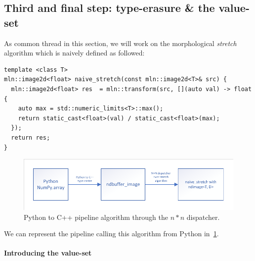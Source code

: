 \subsection{Third and final step: type-erasure \& the value-set}

As common thread in this section, we will work on the morphological \emph{stretch} algorithm which is naively defined as
followed:
\begin{verbatim}
template <class T>
mln::image2d<float> naive_stretch(const mln::image2d<T>& src) {
  mln::image2d<float> res  = mln::transform(src, [](auto val) -> float {
    auto max = std::numeric_limits<T>::max();
    return static_cast<float>(val) / static_cast<float>(max);
  });
  return res;
}
\end{verbatim}

\begin{figure}[htbp]
  \centering
  \includegraphics[width=.8\linewidth]{figs/static_dynamic_bridge/nxndispatch_pipeline}
  \caption{Python to C++ pipeline algorithm through the $n*n$ dispatcher.}
  \label{fig:static_dyn.nxndispatcher}
\end{figure}

We can represent the pipeline calling this algorithm from Python in~\cref{fig:static_dyn.nxndispatcher}.

\paragraph{Introducing the value-set}

